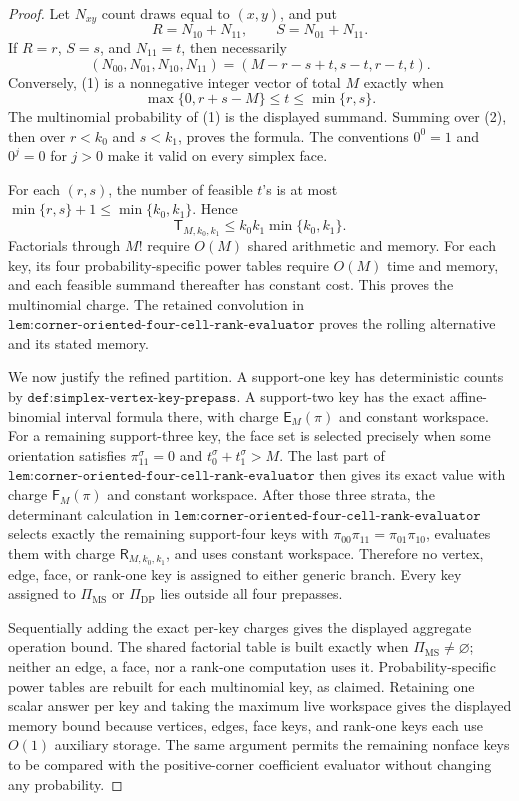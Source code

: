 \documentclass{article}
\begin{document}
\begin{proof}
Let \(N_{xy}\) count draws equal to \((x,y)\), and put
\[
R=N_{10}+N_{11},\qquad S=N_{01}+N_{11}.
\]
If \(R=r\), \(S=s\), and \(N_{11}=t\), then necessarily
\[
(N_{00},N_{01},N_{10},N_{11})
=(M-r-s+t,s-t,r-t,t).
\tag{1}
\]
Conversely, (1) is a nonnegative integer vector of total \(M\) exactly when
\[
\max\{0,r+s-M\}\le t\le\min\{r,s\}.
\tag{2}
\]
The multinomial probability of (1) is the displayed summand. Summing over (2), then over \(r<k_0\) and \(s<k_1\), proves the formula. The conventions \(0^0=1\) and \(0^j=0\) for \(j>0\) make it valid on every simplex face.

For each \((r,s)\), the number of feasible \(t\)'s is at most
\(\min\{r,s\}+1\le\min\{k_0,k_1\}\). Hence
\[
\mathsf T_{M,k_0,k_1}\le k_0k_1\min\{k_0,k_1\}.
\tag{3}
\]
Factorials through \(M!\) require \(O(M)\) shared arithmetic and memory. For each key, its four probability-specific power tables require \(O(M)\) time and memory, and each feasible summand thereafter has constant cost. This proves the multinomial charge. The retained convolution in
\(\texttt{lem:corner-oriented-four-cell-rank-evaluator}\) proves the rolling alternative and its stated memory.

We now justify the refined partition. A support-one key has deterministic counts by \(\texttt{def:simplex-vertex-key-prepass}\). A support-two key has the exact affine-binomial interval formula there, with charge \(\mathsf E_M(\pi)\) and constant workspace. For a remaining support-three key, the face set is selected precisely when some orientation satisfies
\(\pi^\sigma_{11}=0\) and \(t_0^\sigma+t_1^\sigma>M\). The last part of
\(\texttt{lem:corner-oriented-four-cell-rank-evaluator}\) then gives its exact value with charge \(\mathsf F_M(\pi)\) and constant workspace. After those three strata, the determinant calculation in \(\texttt{lem:corner-oriented-four-cell-rank-evaluator}\) selects exactly the remaining support-four keys with \(\pi_{00}\pi_{11}=\pi_{01}\pi_{10}\), evaluates them with charge \(\mathsf R_{M,k_0,k_1}\), and uses constant workspace. Therefore no vertex, edge, face, or rank-one key is assigned to either generic branch. Every key assigned to \(\Pi_{\mathrm{MS}}\) or \(\Pi_{\mathrm{DP}}\) lies outside all four prepasses.

Sequentially adding the exact per-key charges gives the displayed aggregate operation bound. The shared factorial table is built exactly when
\(\Pi_{\mathrm{MS}}\ne\varnothing\); neither an edge, a face, nor a rank-one computation uses it. Probability-specific power tables are rebuilt for each multinomial key, as claimed. Retaining one scalar answer per key and taking the maximum live workspace gives the displayed memory bound because vertices, edges, face keys, and rank-one keys each use \(O(1)\) auxiliary storage. The same argument permits the remaining nonface keys to be compared with the positive-corner coefficient evaluator without changing any probability.


\end{proof}
\end{document}
